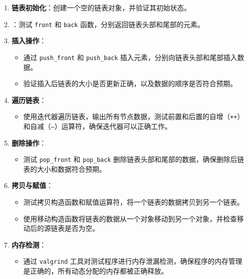 \documentclass[UTF8]{ctexart}
\begin{document}
\begin{enumerate}
    \item \textbf{链表初始化}：创建一个空的链表对象，并验证其初始状态。
    
    \item {}：测试 \texttt{front} 和 \texttt{back} 函数，分别返回链表头部和尾部的元素。
    
    \item \textbf{插入操作}：
    \begin{itemize}
        \item 通过 \texttt{push\_front} 和 \texttt{push\_back} 插入元素，分别向链表头部和尾部插入数据。
        \item 验证插入后链表的大小是否更新正确，以及数据的顺序是否符合预期。
    \end{itemize}

    \item \textbf{遍历链表}：
    \begin{itemize}
        \item 使用迭代器遍历链表，输出所有节点数据，测试前置和后置的自增（\texttt{++}）和自减（\texttt{--}）运算符，确保迭代器可以正确工作。
    \end{itemize}

    \item \textbf{删除操作}：
    \begin{itemize}
        \item 测试 \texttt{pop\_front} 和 \texttt{pop\_back} 删除链表头部和尾部的数据，确保删除后链表的大小和数据符合预期。
    \end{itemize}

    \item \textbf{拷贝与赋值}：
    \begin{itemize}
        \item 测试拷贝构造函数和赋值运算符，将一个链表的数据拷贝到另一个链表。
        \item 使用移动构造函数将链表的数据从一个对象移动到另一个对象，并检查移动后的源链表是否为空。
    \end{itemize}

    \item \textbf{内存检测}：
    \begin{itemize}
        \item 通过 \texttt{valgrind} 工具对测试程序进行内存泄漏检测，确保程序的内存管理是正确的，所有动态分配的内存都被正确释放。
    \end{itemize}
\end{enumerate}
\end{document}

